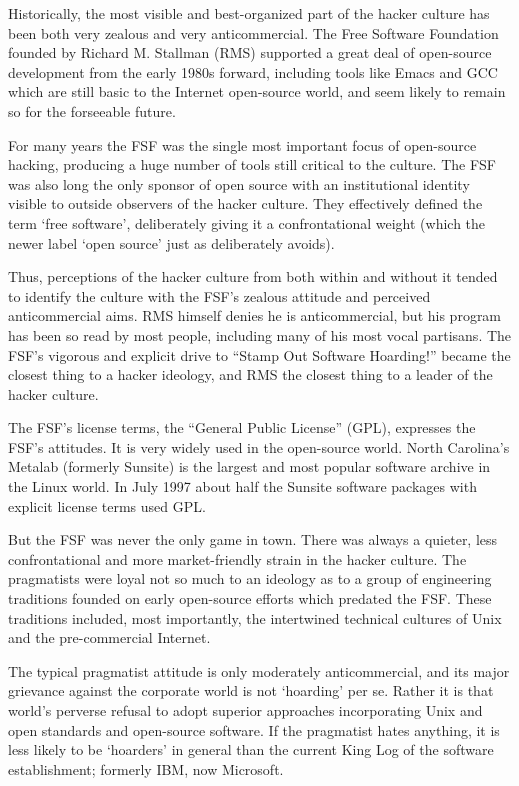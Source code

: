 Historically, the most visible and best-organized part of the hacker culture has
been both very zealous and very anticommercial.  The Free Software Foundation
founded by Richard M.  Stallman (RMS) supported a great deal of open-source
development from the early 1980s forward, including tools like Emacs and GCC
which are still basic to the Internet open-source world, and seem likely to
remain so for the forseeable future.

For many years the FSF was the single most important focus of open-source
hacking, producing a huge number of tools still critical to the culture.  The
FSF was also long the only sponsor of open source with an institutional identity
visible to outside observers of the hacker culture.  They effectively defined
the term `free software', deliberately giving it a confrontational weight (which
the newer label `open source' just as deliberately avoids).

Thus, perceptions of the hacker culture from both within and without it tended
to identify the culture with the FSF's zealous attitude and perceived
anticommercial aims.  RMS himself denies he is anticommercial, but his program
has been so read by most people, including many of his most vocal partisans.
The FSF's vigorous and explicit drive to ``Stamp Out Software Hoarding!'' became
the closest thing to a hacker ideology, and RMS the closest thing to a leader of
the hacker culture.

The FSF's license terms, the ``General Public License'' (GPL), expresses the
FSF's attitudes.  It is very widely used in the open-source world.  North
Carolina's Metalab (formerly Sunsite) is the largest and most popular software
archive in the Linux world.  In July 1997 about half the Sunsite software
packages with explicit license terms used GPL.

But the FSF was never the only game in town.  There was always a quieter, less
confrontational and more market-friendly strain in the hacker culture.  The
pragmatists were loyal not so much to an ideology as to a group of engineering
traditions founded on early open-source efforts which predated the FSF.  These
traditions included, most importantly, the intertwined technical cultures of
Unix and the pre-commercial Internet.

The typical pragmatist attitude is only moderately anticommercial, and its major
grievance against the corporate world is not `hoarding' per se.  Rather it is
that world's perverse refusal to adopt superior approaches incorporating Unix
and open standards and open-source software.  If the pragmatist hates anything,
it is less likely to be `hoarders' in general than the current King Log of the
software establishment; formerly IBM, now Microsoft.

